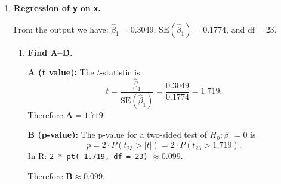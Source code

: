 \documentclass[12pt]{article}
\begin{document}
\begin{enumerate}
\begin{enumerate}
The estimated coefficient is $\hat{\beta}_1 = -0.3533$. This means that a 1\% increase in alcohol consumption is associated with approximately a 0.353\% \textbf{decrease} in heart disease deaths per 100,000 people.

\bigskip

\item \textbf{Test $H_0\colon \beta_1 \ge 0$ vs.\ $H_1\colon \beta_1 < 0$ at 5\%.}

This is a one-sided (left-tailed) test. The test statistic is
$$
t = \frac{\hat{\beta}_1}{\text{SE}(\hat{\beta}_1)} = \frac{-0.3533}{0.1233} = -2.865.
$$
The decision rule at 5\% significance (one-sided, left tail) is: reject $H_0$ if $t < -t_{0.05, 19}$, where $t_{0.05, 19} = 1.729$ (in R: \verb!qt(0.95, df = 19)!).

Since $t = -2.865 < -1.729$, we \textbf{reject} $H_0$ at the 5\% significance level. There is statistically significant evidence that the coefficient on \verb!ln_alcohol! is negative.

\end{enumerate}

\bigskip


\item \textbf{Regression of \texttt{y} on \texttt{x}.}

From the output we have: $\hat{\beta}_1 = 0.3049$, $\text{SE}(\hat{\beta}_1) = 0.1774$, and $\text{df} = 23$.

\begin{enumerate}

\item \textbf{Find A--D.}

\textbf{A (t value):} The $t$-statistic is
$$
t = \frac{\hat{\beta}_1}{\text{SE}(\hat{\beta}_1)} = \frac{0.3049}{0.1774} = 1.719.
$$
Therefore $\mathbf{A = 1.719}$.

\bigskip

\textbf{B (p-value):} The p-value for a two-sided test of $H_0\colon \beta_1 = 0$ is
$$
p = 2 \cdot P(t_{23} > |t|) = 2 \cdot P(t_{23} > 1.719).
$$
In R: \verb!2 * pt(-1.719, df = 23)! $\approx 0.099$.

Therefore $\mathbf{B \approx 0.099}$.

\bigskip


\end{enumerate}
\end{enumerate}
\end{document}
